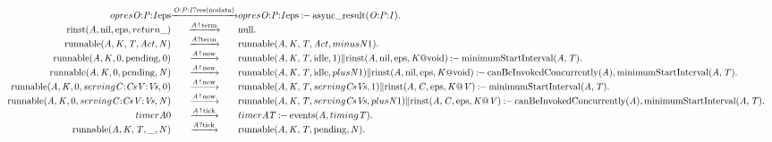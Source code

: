 \[\begin{array}{r@{}c@{}l}
\\\Prule{\Tstep{\Topres{\Top{\Tvar{O}}{\Tvar{P}}{\Tvar{I}}}{\Tatom{eps}}}{\Thear{\Top{\Tvar{O}}{\Tvar{P}}{\Tvar{I}}}{\Tres{\Tatom{nodata}}}}{\Topres{\Top{\Tvar{O}}{\Tvar{P}}{\Tvar{I}}}{\Tatom{eps}}}}{\Tasyncresult{\Top{\Tvar{O}}{\Tvar{P}}{\Tvar{I}}}}.
\\\Pfact{\Tstep{\Trinst{\Tvar{A}}{\Tatom{nil}}{\Tatom{eps}}{\Treturn{\_}}}{\Tsay{\Tvar{A}}{\Tatom{term}}}{\Tatom{null}}}.
\\\Pfact{\Tstep{\Trunnable{\Tvar{A}}{\Tvar{K}}{\Tvar{T}}{\Tvar{Act}}{\Tvar{N}}}{\Thear{\Tvar{A}}{\Tatom{term}}}{\Trunnable{\Tvar{A}}{\Tvar{K}}{\Tvar{T}}{\Tvar{Act}}{\Tminus{\Tvar{N}}{1}}}}.
\\\Prule{\Tstep{\Trunnable{\Tvar{A}}{\Tvar{K}}{0}{\Tatom{pending}}{0}}{\Tsay{\Tvar{A}}{\Tatom{new}}}{\Tpar{\Trunnable{\Tvar{A}}{\Tvar{K}}{\Tvar{T}}{\Tatom{idle}}{1}}{\Trinst{\Tvar{A}}{\Tatom{nil}}{\Tatom{eps}}{\Tap{\Tvar{K}}{\Tatom{void}}}}}}{\TminimumStartInterval{\Tvar{A}}{\Tvar{T}}}.
\\\Prule{\Tstep{\Trunnable{\Tvar{A}}{\Tvar{K}}{0}{\Tatom{pending}}{\Tvar{N}}}{\Tsay{\Tvar{A}}{\Tatom{new}}}{\Tpar{\Trunnable{\Tvar{A}}{\Tvar{K}}{\Tvar{T}}{\Tatom{idle}}{\Tplus{\Tvar{N}}{1}}}{\Trinst{\Tvar{A}}{\Tatom{nil}}{\Tatom{eps}}{\Tap{\Tvar{K}}{\Tatom{void}}}}}}{\TcanBeInvokedConcurrently{\Tvar{A}},\TminimumStartInterval{\Tvar{A}}{\Tvar{T}}}.
\\\Prule{\Tstep{\Trunnable{\Tvar{A}}{\Tvar{K}}{0}{\Tserving{\Tcons{\Tvar{C}}{\Tvar{Cs}}}{\Tcons{\Tvar{V}}{\Tvar{Vs}}}}{0}}{\Tsay{\Tvar{A}}{\Tatom{new}}}{\Tpar{\Trunnable{\Tvar{A}}{\Tvar{K}}{\Tvar{T}}{\Tserving{\Tvar{Cs}}{\Tvar{Vs}}}{1}}{\Trinst{\Tvar{A}}{\Tvar{C}}{\Tatom{eps}}{\Tap{\Tvar{K}}{\Tvar{V}}}}}}{\TminimumStartInterval{\Tvar{A}}{\Tvar{T}}}.
\\\Prule{\Tstep{\Trunnable{\Tvar{A}}{\Tvar{K}}{0}{\Tserving{\Tcons{\Tvar{C}}{\Tvar{Cs}}}{\Tcons{\Tvar{V}}{\Tvar{Vs}}}}{\Tvar{N}}}{\Tsay{\Tvar{A}}{\Tatom{new}}}{\Tpar{\Trunnable{\Tvar{A}}{\Tvar{K}}{\Tvar{T}}{\Tserving{\Tvar{Cs}}{\Tvar{Vs}}}{\Tplus{\Tvar{N}}{1}}}{\Trinst{\Tvar{A}}{\Tvar{C}}{\Tatom{eps}}{\Tap{\Tvar{K}}{\Tvar{V}}}}}}{\TcanBeInvokedConcurrently{\Tvar{A}},\TminimumStartInterval{\Tvar{A}}{\Tvar{T}}}.
\\\Prule{\Tstep{\Ttimer{\Tvar{A}}{0}}{\Tsay{\Tvar{A}}{\Tatom{tick}}}{\Ttimer{\Tvar{A}}{\Tvar{T}}}}{\Tevents{\Tvar{A}}{\Ttiming{\Tvar{T}}}}.
\\\Pfact{\Tstep{\Trunnable{\Tvar{A}}{\Tvar{K}}{\Tvar{T}}{\_}{\Tvar{N}}}{\Thear{\Tvar{A}}{\Tatom{tick}}}{\Trunnable{\Tvar{A}}{\Tvar{K}}{\Tvar{T}}{\Tatom{pending}}{\Tvar{N}}}}.

\end{array}\]
